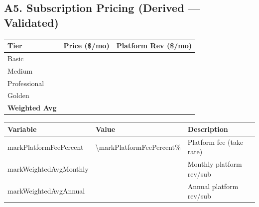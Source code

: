 \subsection*{A5. Subscription Pricing (Derived --- Validated)}
\begin{tabularx}{\linewidth}{l Y Y}
\toprule
\textbf{Tier} & \textbf{Price (\$/mo)} & \textbf{Platform Rev (\$/mo)} \\\midrule
Basic & \validate{\subBasicPrice}{\HCsubBasicPrice} & \validate{\markRevenueBasic}{\HCmarkRevenueBasic} \\
Medium & \validate{\subMediumPrice}{\HCsubMediumPrice} & \validate{\markRevenueMedium}{\HCmarkRevenueMedium} \\
Professional & \validate{\subProfessionalPrice}{\HCsubProfessionalPrice} & \validate{\markRevenueProfessional}{\HCmarkRevenueProfessional} \\
Golden & \validate{\subGoldenPrice}{\HCsubGoldenPrice} & \validate{\markRevenueGolden}{\HCmarkRevenueGolden} \\\midrule
\textbf{Weighted Avg} & \validate{\subWeightedAvgPrice}{\HCsubWeightedAvgPrice} & \validate{\markWeightedAvgMonthly}{\HCmarkWeightedAvgMonthly} \\
\bottomrule
\end{tabularx}

\medskip
\begin{tabularx}{\linewidth}{l Y X}
\toprule
\textbf{Variable} & \textbf{Value} & \textbf{Description} \\\midrule
markPlatformFeePercent & \num{\markPlatformFeePercent}\% & Platform fee (take rate) \\
markWeightedAvgMonthly & \validate{\markWeightedAvgMonthly}{\HCmarkWeightedAvgMonthly} & Monthly platform rev/sub \\
markWeightedAvgAnnual & \validate{\markWeightedAvgAnnual}{\HCmarkWeightedAvgAnnual} & Annual platform rev/sub \\
\bottomrule
\end{tabularx}

